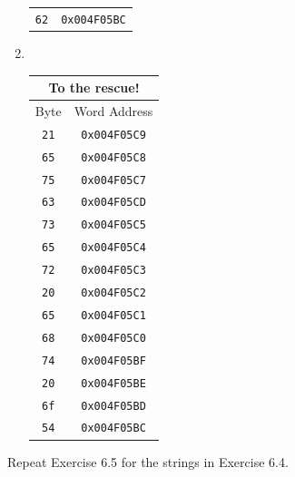 \documentclass[12pt]{article}
\newenvironment{ex}[2][Exercise]{\begin{trivlist}
		\item[\hskip \labelsep {\bfseries #1}\hskip \labelsep {\bfseries #2.}]}{\end{trivlist}}
\newenvironment{sol}[1][Solution]{\begin{trivlist}
		\item[\hskip \labelsep {\bfseries #1:}]}{\end{trivlist}}
\begin{document}
\begin{sol}
\begin{enumerate}[label=(\alph*)]
\begin{center}
\begin{tabular}{cc}
				\texttt{62}	& \texttt{0x004F05BC}
			\end{tabular}
		\end{center}
		\item 
		\
		\begin{center}
			\begin{tabular}{cc}
				\multicolumn{2}{c}{To the rescue!}\\
				\hline
				Byte & Word Address\\
				\hline
				\texttt{21} & \texttt{0x004F05C9}\\
				\texttt{65} & \texttt{0x004F05C8}\\
				\texttt{75} & \texttt{0x004F05C7}\\
				\texttt{63} & \texttt{0x004F05CD}\\
				\texttt{73} & \texttt{0x004F05C5}\\
				\texttt{65} & \texttt{0x004F05C4}\\
				\texttt{72} & \texttt{0x004F05C3}\\
				\texttt{20} & \texttt{0x004F05C2}\\
				\texttt{65} & \texttt{0x004F05C1}\\
				\texttt{68} & \texttt{0x004F05C0}\\
				\texttt{74} & \texttt{0x004F05BF}\\
				\texttt{20} & \texttt{0x004F05BE}\\
				\texttt{6f} & \texttt{0x004F05BD}\\
				\texttt{54} & \texttt{0x004F05BC}
			\end{tabular}
		\end{center}
	\end{enumerate}
\end{sol}

\begin{ex}{6.5}
	Repeat Exercise 6.5 for the strings in Exercise 6.4.
\end{ex}
\end{document}
